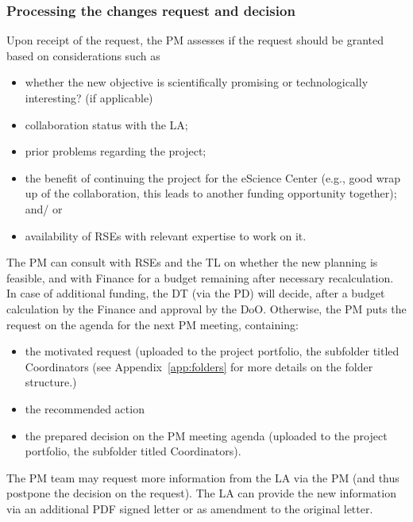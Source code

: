 \subsubsection{Processing the changes request and decision}
Upon receipt of the request, the PM assesses if the request should be granted based on considerations such as 
\begin{itemize}
\item whether the new objective is scientifically promising or technologically interesting? (if applicable)
\item collaboration status with the LA;
\item prior problems regarding the project;
\item the benefit of continuing the project for the eScience Center (e.g., good wrap up of the collaboration, this leads to
another funding opportunity together); and/ or
\item availability of RSEs with relevant expertise to work on it.
\end{itemize}

The PM can consult with RSEs and the TL on whether the new planning is feasible, and with Finance for a budget remaining after necessary recalculation. In case of additional funding, the DT
(via the PD) will decide, after a budget calculation by the Finance and approval by the DoO. Otherwise, the PM puts the
request on the agenda for the next PM meeting, containing: 
\begin{itemize}
\item the motivated request (uploaded to the project portfolio, the subfolder titled Coordinators (see Appendix~\ref{app:folders} for more details on the folder structure.)
\item the recommended action
\item the prepared decision on the PM meeting agenda (uploaded to the project portfolio, the subfolder titled Coordinators).
\end{itemize}

The PM team may request more information from the LA via the PM (and thus postpone the decision on the request). The LA
can provide the new information via an additional PDF signed letter or as amendment to the original letter.

